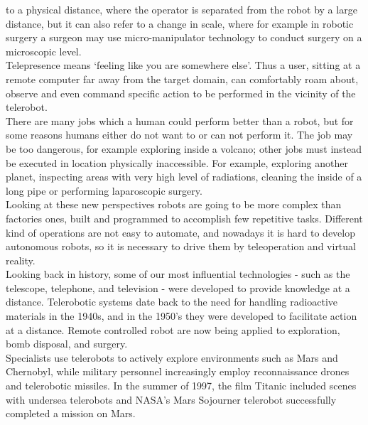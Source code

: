 to a physical distance, where the operator is separated from the robot
by a large distance, but it can also refer to a change in scale, where
for example in robotic surgery a surgeon may use micro-manipulator
technology to conduct surgery on a microscopic level.
\\
Telepresence means `feeling like you are somewhere else'.
Thus a user, sitting at a remote computer far away from the target
domain, can comfortably roam about, observe and even command
specific action to be performed in the vicinity of the telerobot.
\\
There are many jobs which a human could perform better than a robot, but
for some reasons humans either do not want to or can not perform it.
The job may be too dangerous, for example exploring inside a volcano;
other jobs must instead be executed in location physically inaccessible.
For example, exploring another planet, inspecting areas with very high
level of radiations, cleaning the inside of a long pipe or performing
laparoscopic surgery.
\\
Looking at these new perspectives robots are going to be more complex
than factories ones, built and programmed to accomplish few repetitive
tasks. Different kind of operations are not easy
to automate, and nowadays it is hard to develop autonomous robots, so
it is necessary to drive them by teleoperation and virtual reality.
\\
Looking back in history, some of our most influential technologies
- such as the telescope,
telephone, and television - were developed to provide knowledge
at a distance. Telerobotic systems date back to the need for handling
radioactive materials in the 1940s, and in the 1950's they were developed
to facilitate action at a distance. Remote controlled robot are now
being applied to exploration, bomb disposal, and surgery.
\\
Specialists use telerobots to actively explore environments such
as Mars and Chernobyl, while military personnel increasingly employ
reconnaissance drones and telerobotic missiles.
In the summer of 1997, the film Titanic included scenes with undersea
telerobots and NASA's Mars Sojourner telerobot successfully
completed a mission on Mars.

